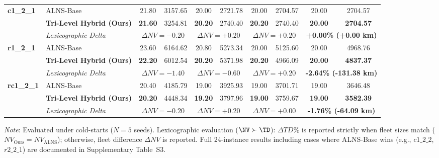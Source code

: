 \begin{table}[!t]
\begin{tabular*}{\textwidth}{@{\extracolsep{\fill}} ll cccccc cc @{}}
\midrule
\multirow{3}{*}{\textbf{c1\_2\_1}} & ALNS-Base & 21.80 & 3157.65 & 20.00 & 2721.78 & 20.00 & 2704.57 & 20.00 & 2704.57 \\
 & \textbf{Tri-Level Hybrid (Ours)} & \textbf{21.60} & 3254.81 & \textbf{20.20} & 2740.40 & \textbf{20.20} & 2740.40 & \textbf{20.00} & \textbf{2704.57} \\
 & \textit{Lexicographic Delta} & \multicolumn{2}{c}{$\Delta NV = -0.20$} & \multicolumn{2}{c}{$\Delta NV = +0.20$} & \multicolumn{2}{c}{$\Delta NV = +0.20$} & \multicolumn{2}{c}{\textbf{+0.00\% (+0.00 km)}} \\
\midrule
\multirow{3}{*}{\textbf{r1\_2\_1}} & ALNS-Base & 23.60 & 6164.62 & 20.80 & 5273.34 & 20.00 & 5125.60 & 20.00 & 4968.76 \\
 & \textbf{Tri-Level Hybrid (Ours)} & \textbf{22.20} & 6012.54 & \textbf{20.20} & 5371.98 & \textbf{20.20} & 4966.09 & \textbf{20.00} & \textbf{4837.37} \\
 & \textit{Lexicographic Delta} & \multicolumn{2}{c}{$\Delta NV = -1.40$} & \multicolumn{2}{c}{$\Delta NV = -0.60$} & \multicolumn{2}{c}{$\Delta NV = +0.20$} & \multicolumn{2}{c}{\textbf{-2.64\% (-131.38 km)}} \\
\midrule
\multirow{3}{*}{\textbf{rc1\_2\_1}} & ALNS-Base & 20.40 & 4185.79 & 19.00 & 3925.93 & 19.00 & 3701.71 & 19.00 & 3646.48 \\
 & \textbf{Tri-Level Hybrid (Ours)} & \textbf{20.20} & 4448.34 & \textbf{19.20} & 3797.96 & \textbf{19.00} & 3759.67 & \textbf{19.00} & \textbf{3582.39} \\
 & \textit{Lexicographic Delta} & \multicolumn{2}{c}{$\Delta NV = -0.20$} & \multicolumn{2}{c}{$\Delta NV = +0.20$} & \multicolumn{2}{c}{$\Delta NV = +0.00$} & \multicolumn{2}{c}{\textbf{-1.76\% (-64.09 km)}} \\
\bottomrule
\end{tabular*}
{\raggedright \footnotesize \textit{Note}: Evaluated under cold-starts ($N=5$ seeds). Lexicographic evaluation ($\NV \succ \TD$): $\Delta TD\%$ is reported strictly when fleet sizes match ($NV_{\text{Ours}} = NV_{\text{ALNS}}$); otherwise, fleet difference $\Delta NV$ is reported. Full 24-instance results including cases where ALNS-Base wins (e.g., $c1\_2\_2$, $r2\_2\_1$) are documented in Supplementary Table~S3.\par}
\end{table}

